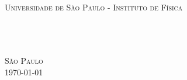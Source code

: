 \begin{titlepage}
\begin{fullwidth}
\begin{center}


\textsc{\LARGE Universidade de São Paulo - Instituto de Física}\\[3cm]

\HRule \\[0.4cm]
\textsc{\textit{\titlefont {\titletext}\\[1.0cm] \subtitlefont {\subtitletext}}}
\HRule\\[2.2cm]
\textsc{\LARGE \authorinfo }
\vfill

\textsc{\LARGE São Paulo}\\
\textsc{\LARGE \today}

\end{center}
\end{fullwidth}
\end{titlepage}